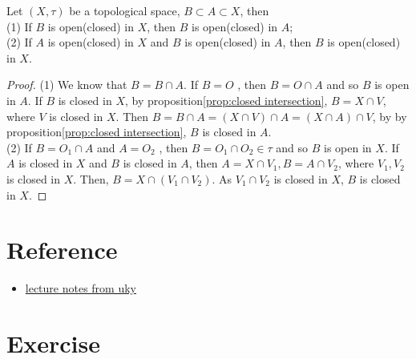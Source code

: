 \begin{proposition}{}{}
    Let $(X,\tau)$ be a topological space, $B\subset A\subset X$, then\\
    (1) If $B$ is open(closed) in $X$, then $B$ is open(closed) in $A$;\\
    (2) If $A$ is open(closed) in $X$ and $B$ is open(closed) in $A$, then $B$ is open(closed) in $X$.
\end{proposition}
\begin{proof}
    (1) We know that $B=B\cap A$. If $B=O$ , then $B = O\cap A$ and so $B$ is open in $A$. 
    If $B$ is closed in $X$, by proposition\ref{prop:closed intersection}, $B=X\cap V$, where $V$ is closed in $X$. 
    Then $B=B\cap A = (X\cap V)\cap A = (X\cap A)\cap V$, by by proposition\ref{prop:closed intersection}, $B$ is closed in $A$.\\
    (2) If $B = O_1\cap A$ and $A=O_2$ , then $B=O_1\cap O_2\in \tau$ and so $B$ is open in $X$.
    If $A$ is closed in $X$ and $B$ is closed in $A$, then $A = X\cap V_1, B=A\cap V_2$, where $V_1,V_2$ is closed in $X$.
    Then, $B = X\cap (V_1\cap V_2)$. As $V_1\cap V_2$ is closed in $X$, $B$ is closed in $X$. 
\end{proof}

\section{Reference}
\begin{itemize}
    \item \href{https://www.ms.uky.edu/~guillou/F14/551Notes-Week4.pdf}{lecture notes from uky}
\end{itemize}
\section{Exercise}

